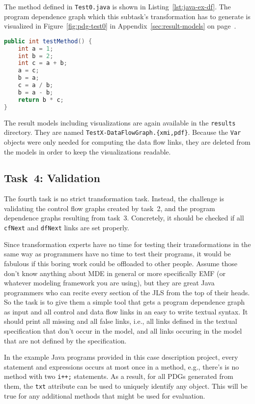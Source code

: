 \documentclass[submission,copyright,creativecommons]{eptcs}
\begin{document}
The method defined in \verb|Test0.java| is shown in
Listing~\ref{lst:java-ex-df}.  The program dependence graph which this
subtask's transformation has to generate is visualized in
Figure~\ref{fig:pdg-test0} in Appendix~\ref{sec:result-models} on
page~\pageref{fig:pdg-test0}.

\begin{lstlisting}[language=Java,caption={An example Java method for illustrating data flow (\texttt{Test0.java})},label={lst:java-ex-df}]
public int testMethod() {
    int a = 1;
    int b = 2;
    int c = a + b;
    a = c;
    b = a;
    c = a / b;
    b = a - b;
    return b * c;
}
\end{lstlisting}

The result models including visualizations are again available in the
\verb|results| directory.  They are named \verb|TestX-DataFlowGraph.{xmi,pdf}|.
Because the \verb|Var| objects were only needed for computing the data flow
links, they are deleted from the models in order to keep the visualizations
readable.


\subsection{Task~4: Validation}
\label{sec:task4-validation}

The fourth task is no strict transformation task.  Instead, the challenge is
validating the control flow graphs created by task~2, and the program
dependence graphs resulting from task~3.  Concretely, it should be checked if
all \verb|cfNext| and \verb|dfNext| links are set properly.

Since transformation experts have no time for testing their transformations in
the same way as programmers have no time to test their programs, it would be
fabulous if this boring work could be offloaded to other people.  Assume those
don't know anything about MDE in general or more specifically EMF (or whatever
modeling framework you are using), but they are great Java programmers who can
recite every section of the JLS \cite{Java7Spec} from the top of their heads.
So the task is to give them a simple tool that gets a program dependence graph
as input and all control and data flow links in an easy to write textual
syntax.  It should print all missing and all false links, i.e., all links
defined in the textual specification that don't occur in the model, and all
links occuring in the model that are not defined by the specification.

In the example Java programs provided in this case description project, every
statement and expressions occurs at most once in a method, e.g., there's is no
method with two \verb|i++;| statements.  As a result, for all PDGs generated
from them, the \verb|txt| attribute can be used to uniquely identify any
object.  This will be true for any additional methods that might be used for
evaluation.
\end{document}
